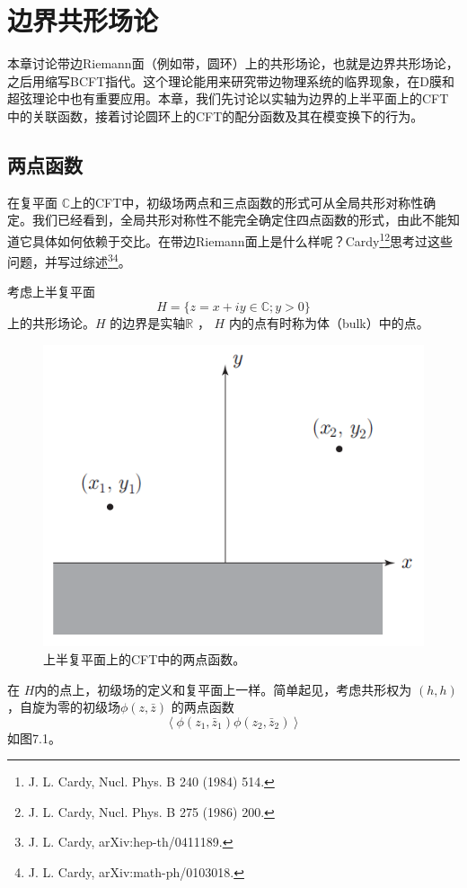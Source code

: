 \chapter{边界共形场论}
本章讨论带边Riemann面（例如带，圆环）上的共形场论，也就是边界共形场论，之后用缩写BCFT指代。这个理论能用来研究带边物理系统的临界现象，在D膜和超弦理论中也有重要应用。本章，我们先讨论以实轴为边界的上半平面上的CFT中的关联函数，接着讨论圆环上的CFT的配分函数及其在模变换下的行为。
\section{ 两点函数}
在复平面 $\mathbb{C} $上的CFT中，初级场两点和三点函数的形式可从全局共形对称性确定。我们已经看到，全局共形对称性不能完全确定住四点函数的形式，由此不能知道它具体如何依赖于交比。在带边Riemann面上是什么样呢？Cardy\footnote{J. L. Cardy, Nucl. Phys. B 240 (1984) 514.}\footnote{J. L. Cardy, Nucl. Phys. B 275 (1986) 200.}思考过这些问题，并写过综述\footnote{J. L. Cardy, arXiv:hep-th/0411189.}\footnote{J. L. Cardy, arXiv:math-ph/0103018.}。

考虑上半复平面
\begin{equation}
	H=\{z=x+i y \in \mathbb{C} ; y>0\}
\end{equation}
上的共形场论。$ H$ 的边界是实轴$ \mathbb{R}$ ， $H$ 内的点有时称为体（bulk）中的点。
\begin{figure}[h]
	\centering
	\includegraphics[width=0.6\linewidth]{fig/7.1.png}
	\caption{上半复平面上的CFT中的两点函数。}
\end{figure}
在 $H $内的点上，初级场的定义和复平面上一样。简单起见，考虑共形权为 $(h, h)$ ，自旋为零的初级场$ \phi(z, \bar{z})$ 的两点函数
$$
\left\langle\phi\left(z_{1}, \bar{z}_{1}\right) \phi\left(z_{2}, \bar{z}_{2}\right)\right\rangle
$$
如图7.1。

